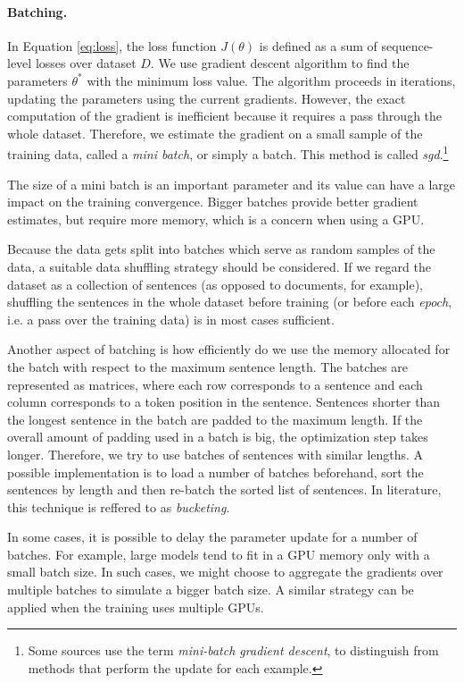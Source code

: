 \paragraph{Batching.} In Equation \ref{eq:loss}, the loss function $J(\theta)$
is defined as a sum of sequence-level losses over dataset $D$. We use gradient
descent algorithm to find the parameters $\theta^*$ with the minimum loss
value. The algorithm proceeds in iterations, updating the parameters using the
current gradients.  However, the exact computation of the gradient is
inefficient because it requires a pass through the whole dataset. Therefore, we
estimate the gradient on a small sample of the training data, called a
\emph{mini batch}, or simply a batch. This method is called
\emph{\ac{sgd}}.\footnote{Some sources use the term \emph{mini-batch gradient
    descent}, to distinguish from methods that perform the update for each
  example.}

The size of a mini batch is an important parameter and its value can have a
large impact on the training convergence. Bigger batches provide better
gradient estimates, but require more memory, which is a concern when using a
GPU.

Because the data gets split into batches which serve as random samples of the
data, a suitable data shuffling strategy should be considered. If we regard the
dataset as a collection of sentences (as opposed to documents, for example),
shuffling the sentences in the whole dataset before training (or before each
\emph{epoch}, i.e. a pass over the training data) is in most cases sufficient.

Another aspect of batching is how efficiently do we use the memory allocated
for the batch with respect to the maximum sentence length. The batches are
represented as matrices, where each row corresponds to a sentence and each
column corresponds to a token position in the sentence. Sentences shorter than
the longest sentence in the batch are padded to the maximum length. If the
overall amount of padding used in a batch is big, the optimization step takes
longer. Therefore, we try to use batches of sentences with similar lengths. A
possible implementation is to load a number of batches beforehand, sort the
sentences by length and then re-batch the sorted list of sentences. In
literature, this technique is reffered to as \emph{bucketing}.

In some cases, it is possible to delay the parameter update for a number of
batches. For example, large models tend to fit in a GPU memory only with a
small batch size. In such cases, we might choose to aggregate the gradients
over multiple batches to simulate a bigger batch size. A similar strategy can
be applied when the training uses multiple GPUs.

